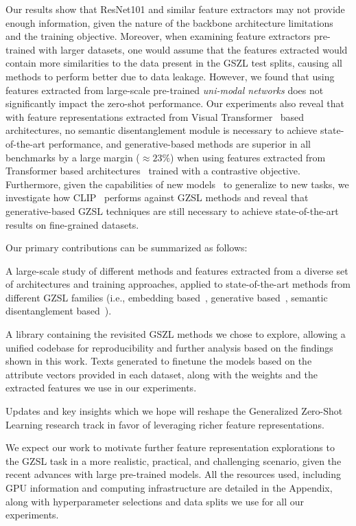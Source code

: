 Our results show that ResNet101 and similar feature extractors may not provide enough information, given the nature of the backbone architecture limitations and the training objective. 
Moreover, when examining feature extractors pre-trained with larger datasets, one would assume that the features extracted would contain more similarities to the data present in the GSZL test splits, causing all methods to perform better due to data leakage. However, we found that using features extracted from large-scale pre-trained {\em uni-modal networks} does not significantly impact the zero-shot performance.
Our experiments also reveal that with feature representations extracted from Visual Transformer~\cite{ViT} based architectures, no semantic disentanglement module is necessary to achieve state-of-the-art performance, and generative-based methods are superior in all benchmarks by a large margin ($\approx23\%$) when using features extracted from Transformer based architectures~\cite{ViT} trained with a contrastive objective.
Furthermore, given the capabilities of new models~\cite{CLIP, ALIGN, Singh2022FLAVAAF} to generalize to new tasks, we investigate how CLIP~\cite{CLIP} performs against GZSL methods and reveal that generative-based GZSL techniques are still necessary to achieve state-of-the-art results on fine-grained datasets.


Our primary contributions can be summarized as follows:


\begin{compactitem}
\item A large-scale study of different methods and features extracted from a diverse set of architectures and training approaches, applied to state-of-the-art methods from different GZSL families (i.e., embedding based~\cite{ALE, ESZSL, DeViSE}, generative based~\cite{tfvaegan, CADA_VAE, CE}, semantic disentanglement based~\cite{Tong2019HierarchicalDO, Chen2021FREE, SDGZSL}). 


\item A library containing the revisited GSZL methods we chose to explore, allowing a unified codebase for reproducibility and further analysis based on the findings shown in this work. Texts generated to finetune the models based on the attribute vectors provided in each dataset, along with the weights and the extracted features we use in our experiments.

\item Updates and key insights which we hope will reshape the Generalized Zero-Shot Learning research track in favor of leveraging richer feature representations. 

\end{compactitem}

We expect our work to motivate further feature representation explorations to the GZSL task in a more realistic, practical, and challenging scenario, given the recent advances with large pre-trained models. All the resources used, including GPU information and computing infrastructure are detailed in the Appendix, along with hyperparameter selections and data splits we use for all our experiments.


